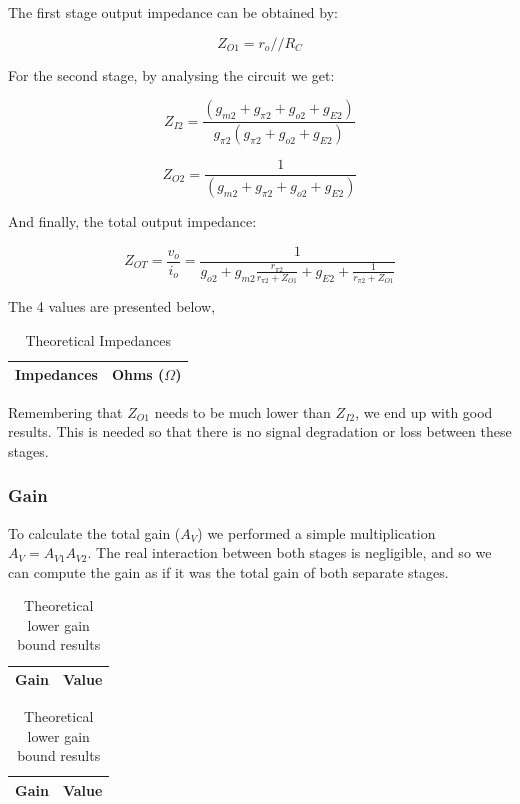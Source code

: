 The first stage output impedance can be obtained by:

\begin{equation}
    Z_{O1}=r_o // R_C  
\end{equation}

For the second stage, by analysing the circuit we get:

\begin{equation}
    Z_{I2}=\frac{(g_{m2}+g_{\pi2}+g_{o2}+g_{E2})}{g_{\pi2}(g_{\pi2}+g_{o2}+g_{E2})}
\end{equation}

\begin{equation}
    Z_{O2}=\frac{1}{(g_{m2}+g_{\pi2}+g_{o2}+g_{E2})}
\end{equation}

And finally, the total output impedance:

\begin{equation}
    Z_{OT}=\frac{v_o}{i_o}=\frac{1}{g_{o2}+g_{m2}\frac{r_{\pi2}}{r_{\pi2}+Z_{O1}}+g_{E2}+\frac{1}{r_{\pi2}+Z_{O1}}}
\end{equation}

The 4 values are presented below,

\begin{table}[h]
    \centering
    \begin{tabular}{|l|c|}
    \hline
    {\bf Impedances} & {\bf Ohms ($\Omega$)} \\ \hline
    
    \end{tabular}
    \caption{Theoretical Impedances}
    \label{tab:theo_imp}
\end{table}

Remembering that $Z_{O1}$ needs to be  much lower than $Z_{I2}$, we end up with good results. This is needed so that there is no signal degradation or loss between these stages.


\subsubsection{Gain}

To calculate the total gain ($A_{V}$) we performed a simple multiplication $A_V=A_{V1}A_{V2}$. The real interaction between both stages is negligible, and so we can compute the gain as if it was the total gain of both separate stages.

\begin{table}[h]
\parbox{.4\linewidth}{
  \centering
    \begin{tabular}{|l|c|}
    \hline
    {\bf Gain} & {\bf Value} \\ \hline
    
    \end{tabular}
    \caption{Theoretical upper gain bound results}
    \label{tab:theo_gains_high}
  }
  \hfill
  \parbox{.4\textwidth}{
  \centering  
  \begin{tabular}{|c|c|}
    \hline    
    {\bf Gain} & {\bf Value} \\ \hline
    
  \end{tabular}
  \caption{Theoretical lower gain bound results}
  \label{tab:theo_gains_low}
  }
  \end{table}
  


